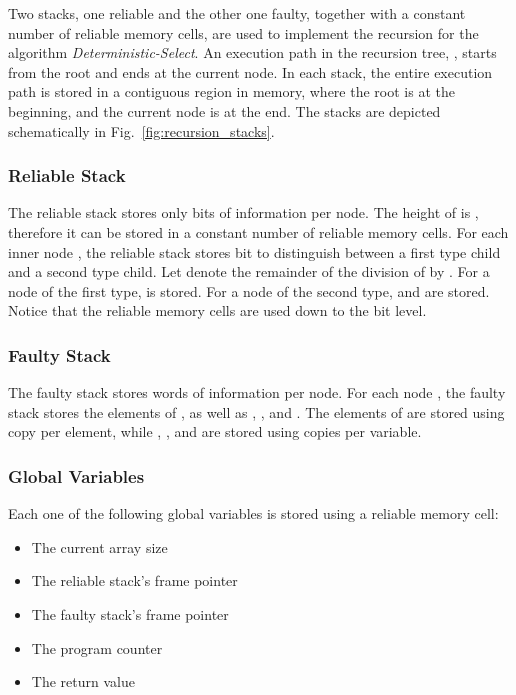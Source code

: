 \documentclass{llncs}
\begin{document}
Two stacks, one reliable and the other one faulty, together with a constant number of reliable memory cells, are used to implement the recursion for the algorithm \emph{Deterministic-Select}. An execution path in the recursion tree, , starts from the root and ends at the current node. In each stack, the entire execution path is stored in a contiguous region in memory, where the root is at the beginning, and the current node is at the end. The stacks are depicted schematically in Fig.~\ref{fig:recursion_stacks}.

\subsubsection{Reliable Stack}

The reliable stack stores only  bits of information per node. The height of  is , therefore it can be stored in a constant number of reliable memory cells. For each inner node , the reliable stack stores  bit to distinguish between a first type child and a second type child. Let  denote the remainder of the division of  by . For a node of the first type,  is stored. For a node of the second type,  and  are stored. Notice that the  reliable memory cells are used down to the bit level.

\subsubsection{Faulty Stack}

The faulty stack stores  words of information per node. For each node , the faulty stack stores the elements of , as well as , , and . The elements of  are stored using  copy per element, while , , and  are stored using  copies per variable.

\subsubsection{Global Variables}

Each one of the following global variables is stored using a reliable memory cell:

\begin{itemize}
	\item The current array size
	\item The reliable stack's frame pointer
	\item The faulty stack's frame pointer
	\item The program counter
	\item The return value
\end{itemize}
\end{document}
